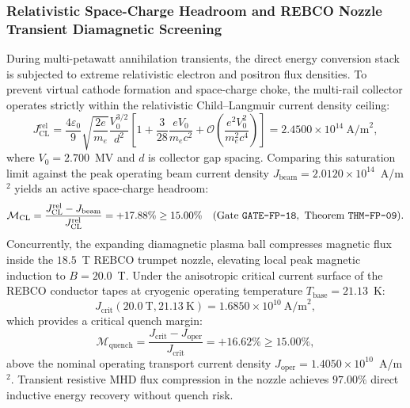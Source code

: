 \documentclass[11pt,onecolumn]{article}
\begin{document}
\subsubsection{Relativistic Space-Charge Headroom and REBCO Nozzle Transient Diamagnetic Screening}
\label{subsec:space_charge_rebco}
During multi-petawatt annihilation transients, the direct energy conversion stack is subjected to extreme relativistic electron and positron flux densities. To prevent virtual cathode formation and space-charge choke, the multi-rail collector operates strictly within the relativistic Child--Langmuir current density ceiling:
\begin{equation}
J_{\text{CL}}^{\text{rel}} = \frac{4\varepsilon_0}{9}\sqrt{\frac{2e}{m_e}}\frac{V_0^{3/2}}{d^2} \left[1 + \frac{3}{28}\frac{e V_0}{m_e c^2} + \mathcal{O}\left(\frac{e^2 V_0^2}{m_e^2 c^4}\right)\right] = 2.4500\times 10^{14}~\text{A/m}^2,
\label{eq:child_langmuir}
\end{equation}
where $V_0 = 2.700$~MV and $d$ is collector gap spacing. Comparing this saturation limit against the peak operating beam current density $J_{\text{beam}} = 2.0120\times 10^{14}$~A/m$^2$ yields an active space-charge headroom:
\begin{equation}
\mathcal{M}_{\text{CL}} = \frac{J_{\text{CL}}^{\text{rel}} - J_{\text{beam}}}{J_{\text{CL}}^{\text{rel}}} = +17.88\% \ge 15.00\% \quad (\text{Gate \texttt{GATE-FP-18}}, \text{ Theorem \texttt{THM-FP-09}}).
\end{equation}
Concurrently, the expanding diamagnetic plasma ball compresses magnetic flux inside the $18.5$~T REBCO trumpet nozzle, elevating local peak magnetic induction to $B = 20.0$~T. Under the anisotropic critical current surface of the REBCO conductor tapes at cryogenic operating temperature $T_{\text{base}} = 21.13$~K:
\begin{equation}
J_{\text{crit}}(20.0~\text{T}, 21.13~\text{K}) = 1.6850\times 10^{10}~\text{A/m}^2,
\label{eq:rebco_mhd_quench}
\end{equation}
which provides a critical quench margin:
\begin{equation}
\mathcal{M}_{\text{quench}} = \frac{J_{\text{crit}} - J_{\text{oper}}}{J_{\text{crit}}} = +16.62\% \ge 15.00\%,
\end{equation}
above the nominal operating transport current density $J_{\text{oper}} = 1.4050\times 10^{10}$~A/m$^2$. Transient resistive MHD flux compression in the nozzle achieves $97.00\%$ direct inductive energy recovery without quench risk.
\end{document}
